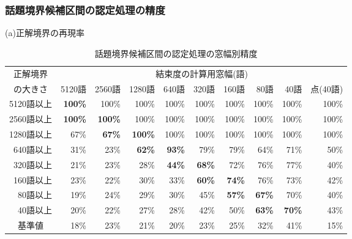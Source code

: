 \subsubsection{話題境界候補区間の認定処理の精度}

\begin{table}[htbp]\footnotesize
  \begin{center}
    \caption{話題境界候補区間の認定処理の窓幅別精度}
    \label{tab:話題境界候補区間認定処理の精度}
    \leavevmode
    (a)正解境界の再現率\\\medskip{}
    \begin{tabular}{|r|r|r|r|r|r|r|r|r||r|}
      \hline
      \multicolumn{1}{|c|}{正解境界}
        & \multicolumn{9}{|c|}{結束度の計算用窓幅(語)}\\ \cline{2-10}
      \multicolumn{1}{|c|}{の大きさ}
        & 5120語& 2560語& 1280語& 640語 & 320語 & 160語 & 80語  & 40語
        & \multicolumn{1}{|c|}{点(40語)} \\
      \hline
      5120語以上 &\bf 100\% &100\% &100\% &100\% &100\% &100\% &100\% &100\% &100\% \\
      2560語以上 &\bf 100\% &\bf 100\% &100\% &100\% &100\% &100\% &100\% &100\% &100\% \\
      1280語以上 & 67\% &\bf 67\% &\bf 100\% &100\% &100\% &100\% &100\% &100\% &100\% \\
      \hline
       640語以上 & 31\% & 23\% &\bf 62\% &\bf 93\% & 79\% & 79\% & 64\% & 71\% & 50\% \\
       320語以上 & 21\% & 23\% & 28\% &\bf 44\% &\bf 68\% & 72\% & 76\% & 77\% & 40\% \\
       160語以上 & 23\% & 22\% & 30\% & 33\% &\bf 60\% &\bf 74\% & 76\% & 73\% & 42\% \\
        80語以上 & 19\% & 24\% & 29\% & 30\% & 45\% &\bf 57\% &\bf 67\% & 70\% & 40\% \\
        40語以上 & 20\% & 22\% & 27\% & 28\% & 42\% & 50\% &\bf 63\% &\bf 70\% & 43\% \\
      \hline
      \multicolumn{1}{|c|}{基準値}
             & 18\% & 23\% & 21\% & 20\% & 23\% & 25\% &  32\% &  41\% &  15\% \\
             
             
             

\end{tabular}
\end{center}
\end{table}
